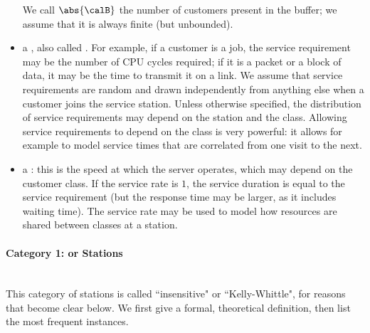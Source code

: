 \begin{itemize}
   We call $\abs{\calB}$ the number of customers present in
   the buffer; we assume that it is always finite (but
unbounded).
  \item a , also called . For example, if a customer is a job, the
      service requirement may be the number of CPU cycles
      required; if it is a packet or a block of data, it
      may be the time to transmit it on a link. We assume
      that service requirements are random and drawn
      independently from anything else when a customer
      joins the service station. Unless otherwise
      specified, the distribution of service requirements
      may depend on the station and the class. Allowing
      service requirements to depend on the class is very
      powerful: it allows for example to model service
      times that are correlated from one visit to the next.
  \item a : this is the speed at which the server operates,
  which may depend on the customer class. If the service rate is $1$, the service duration is equal to the service requirement (but the response time may be larger, as it includes waiting time).
The service rate may be
used to model how resources are shared between
classes at a station.
\end{itemize}


\paragraph{Category 1:  or  Stations}~\\

This category of stations is called
``insensitive" or ``Kelly-Whittle", for reasons
that become clear below. We first give a formal,
theoretical definition, then list the most
frequent instances.

